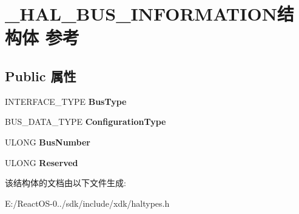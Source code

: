 \hypertarget{struct___h_a_l___b_u_s___i_n_f_o_r_m_a_t_i_o_n}{}\section{\+\_\+\+H\+A\+L\+\_\+\+B\+U\+S\+\_\+\+I\+N\+F\+O\+R\+M\+A\+T\+I\+O\+N结构体 参考}
\label{struct___h_a_l___b_u_s___i_n_f_o_r_m_a_t_i_o_n}
\subsection*{Public 属性}
\begin{DoxyCompactItemize}
\item 
\mbox{\label{struct___h_a_l___b_u_s___i_n_f_o_r_m_a_t_i_o_n_a2e56fd187a4cc5c1298c3fee6fcc3991}} 
I\+N\+T\+E\+R\+F\+A\+C\+E\+\_\+\+T\+Y\+PE {\bfseries Bus\+Type}
\item 
\mbox{\label{struct___h_a_l___b_u_s___i_n_f_o_r_m_a_t_i_o_n_a91b18821d28b135a96412396f99728ce}} 
B\+U\+S\+\_\+\+D\+A\+T\+A\+\_\+\+T\+Y\+PE {\bfseries Configuration\+Type}
\item 
\mbox{\label{struct___h_a_l___b_u_s___i_n_f_o_r_m_a_t_i_o_n_a36bc48b459bfa726fc99a4ed7a27562f}} 
U\+L\+O\+NG {\bfseries Bus\+Number}
\item 
\mbox{\label{struct___h_a_l___b_u_s___i_n_f_o_r_m_a_t_i_o_n_a7442236c7f3819cea91fb7b34186939d}} 
U\+L\+O\+NG {\bfseries Reserved}
\end{DoxyCompactItemize}


该结构体的文档由以下文件生成\+:\begin{DoxyCompactItemize}
\item 
E\+:/\+React\+O\+S-\/0../sdk/include/xdk/haltypes.\+h\end{DoxyCompactItemize}
